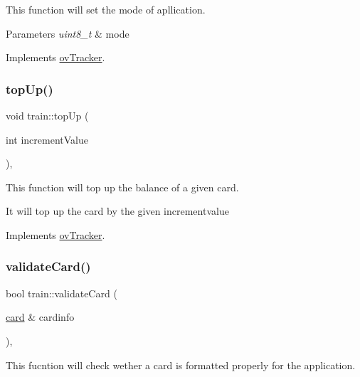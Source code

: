 This function will set the mode of apllication. 


\begin{DoxyParams}{Parameters}
{\em uint8\+\_\+t} & mode \\
\hline
\end{DoxyParams}


Implements \hyperlink{classovTracker_a776f469f9db184664e4f4425cca2df32}{ov\+Tracker}.

\mbox{\label{classtrain_a1bb8ac7f3f0bf3bfe61cf479abfe4cbb}} 
\subsubsection{\texorpdfstring{top\+Up()}{topUp()}}
{\footnotesize\ttfamily void train\+::top\+Up (\begin{DoxyParamCaption}\item[{int}]{increment\+Value }\end{DoxyParamCaption})\hspace{0.3cm}{\ttfamily [override]}, {\ttfamily [virtual]}}



This function will top up the balance of a given card. 

It will top up the card by the given incrementvalue 

Implements \hyperlink{classovTracker_a9611f8fe5ed1937262ebcd89bd7ee617}{ov\+Tracker}.

\mbox{\label{classtrain_aa484ea80f6754481e8c566da13c72f82}} 
\subsubsection{\texorpdfstring{validate\+Card()}{validateCard()}}
{\footnotesize\ttfamily bool train\+::validate\+Card (\begin{DoxyParamCaption}\item[{\hyperlink{classcard}{card} \&}]{cardinfo }\end{DoxyParamCaption})\hspace{0.3cm}{\ttfamily [override]}, {\ttfamily [virtual]}}



This fucntion will check wether a card is formatted properly for the application. 

